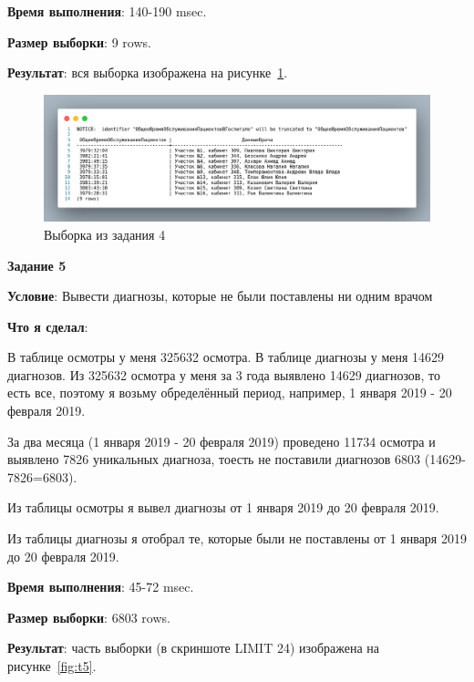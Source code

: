 \textbf{Время выполнения}: 140-190 msec.

\textbf{Размер выборки}: 9 rows.

\textbf{Результат}: вся выборка изображена на рисунке~\ref{fig:t4}.

\begin{figure}[!h]
  \centering

  \includegraphics[width=16cm]
  {../sql/task4/4-out.png}

  \caption{Выборка из задания 4}

  \label{fig:t4}
\end{figure}


\begin{center}
  \textbf{Задание 5}
\end{center}
  
\textbf{Условие}:
Вывести диагнозы, которые не были поставлены ни одним врачом
  
\textbf{Что я сделал}:

В таблице осмотры у меня 325632 осмотра. В таблице диагнозы у меня 14629 диагнозов.
Из 325632 осмотра у меня за 3 года выявлено 14629 диагнозов, то есть все,
поэтому я возьму обределённый период, например, 1 января 2019 - 20 февраля 2019.

За два месяца (1 января 2019 - 20 февраля 2019) проведено 11734 осмотра и выявлено
7826 уникальных диагноза, тоесть не поставили диагнозов 6803 (14629-7826=6803).

Из таблицы осмотры я вывел диагнозы от 1 января 2019 до 20 февраля 2019.

Из таблицы диагнозы я отобрал те, которые были не поставлены от 1 января 2019 до 20 февраля 2019.



\textbf{Время выполнения}: 45-72 msec.

\textbf{Размер выборки}: 6803 rows.

\textbf{Результат}: часть выборки (в скриншоте LIMIT 24) изображена на рисунке~\ref{fig:t5}.

